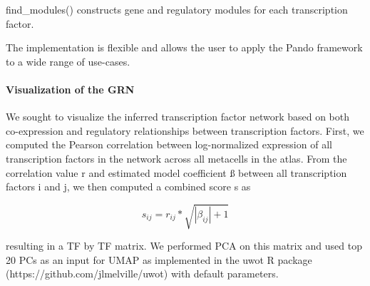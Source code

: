 find\_modules() constructs gene and regulatory modules for each transcription factor.
 
The implementation is flexible and allows the user to apply the Pando framework to a wide range of use-cases.
 
\paragraph{Visualization of the GRN}
We sought to visualize the inferred transcription factor network based on both co-expression and regulatory relationships between transcription factors. First, we computed the Pearson correlation between log-normalized expression of all transcription factors in the network across all metacells in the atlas. From the correlation value r and estimated model coefficient ß between all transcription factors i and j, we then computed a combined score s as
 
\[ s_{ij} = r_{ij} * \sqrt{\left\lvert \beta_{ij} \right\rvert + 1} \]
 
resulting in a TF by TF matrix. We performed PCA on this matrix and used top 20 PCs as an input for UMAP as implemented in the uwot R package (https://github.com/jlmelville/uwot) with default parameters.
 

